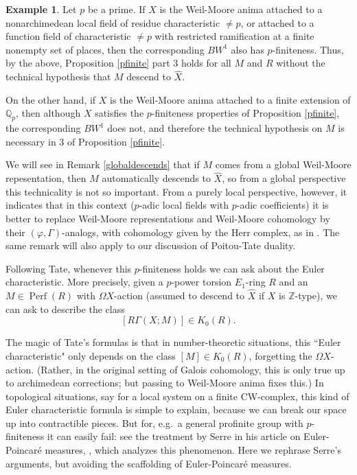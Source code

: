 \documentclass[12pt]{article}
\theoremstyle{definition}
\newtheorem{example}[theorem]{Example}
\newcommand{\on}{\operatorname}
\newcommand{\mbb}{\mathbb}
\newcommand{\wh}{\widehat}
\begin{document}
\begin{example}
Let $p$ be a prime.  If $X$ is the Weil-Moore anima attached to a nonarchimedean local field of residue characteristic $\neq p$, or attached to a function field of characteristic $\neq p$ with restricted ramification at a finite nonempty set of places, then the corresponding $BW^1$ also has $p$-finiteness.  Thus, by the above, Proposition \ref{pfinite} part 3 holds for all $M$ and $R$ without the technical hypothesis that $M$ descend to $\wh{X}$.

On the other hand, if $X$ is the Weil-Moore anima attached to a finite extension of $\mbb{Q}_p$, then although $X$ satisfies the $p$-finiteness properties of Proposition \ref{pfinite}, the corresponding $BW^1$ does not, and therefore the technical hypothesis on $M$ is necessary in 3 of Proposition \ref{pfinite}.

We will see in Remark \ref{globaldescends} that if $M$ comes from a global Weil-Moore repesentation, then $M$ automatically descends to $\wh{X}$, so from a global perspective this technicality is not so important.  From a purely local perspective, however, it indicates that in this context ($p$-adic local fields with $p$-adic coefficients) it is better to replace Weil-Moore representations and Weil-Moore cohomology by their $(\varphi,\Gamma)$-analogs, with cohomology given by the Herr complex, as in \cite{emertongee}.  The same remark will also apply to our discussion of Poitou-Tate duality.
\end{example}

Following Tate, whenever this $p$-finiteness holds we can ask about the Euler characteristic.  More precisely, given a $p$-power torsion $E_1$-ring $R$ and an $M\in\on{Perf}(R)$ with $\Omega X$-action (assumed to descend to $\wh{X}$ if $X$ is $\mbb{Z}$-type), we can ask to describe the class
$$[R\Gamma(X;M)] \in K_0(R).$$

The magic of Tate's formulas is that in number-theoretic situations, this ``Euler characteristic" only depends on the class $[M]\in K_0(R)$, forgetting the $\Omega X$-action.  (Rather, in the original setting of Galois cohomology, this is only true up to archimedean corrections; but passing to Weil-Moore anima fixes this.)  In topological situations, say for a local system on a finite CW-complex, this kind of Euler characteristic formula is simple to explain, because we can break our space up into contractible pieces.  But for, e.g.\ a general profinite group with $p$-finiteness it can easily fail: see the treatment by Serre in his article on Euler-Poincar\'{e} measures, \cite{serreep}, which analyzes this phenomenon.  Here we rephrase Serre's arguments, but avoiding the scaffolding of Euler-Poincar\'{e} measures.
\end{document}
